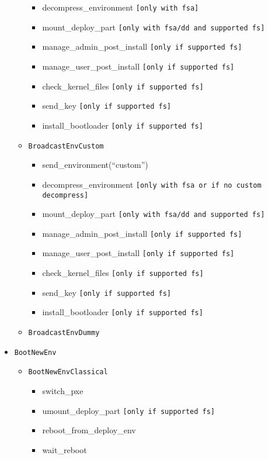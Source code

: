 \documentclass[a4wide,10pt,oneside]{book}
\begin{document}
\begin{itemize}
\begin{itemize}
\begin{itemize}
      \item decompress\_environment \texttt{[only with fsa]}
      \item mount\_deploy\_part \texttt{[only with fsa/dd and supported fs]}
      \item manage\_admin\_post\_install \texttt{[only if supported fs]}
      \item manage\_user\_post\_install \texttt{[only if supported fs]}
      \item check\_kernel\_files \texttt{[only if supported fs]}
      \item send\_key \texttt{[only if supported fs]}
      \item install\_bootloader \texttt{[only if supported fs]}
      \end{itemize}
    \item \texttt{BroadcastEnvCustom}
      \begin{itemize}
      \item send\_environment(``custom'')
      \item decompress\_environment \texttt{[only with fsa or if no custom decompress]}
      \item mount\_deploy\_part \texttt{[only with fsa/dd and supported fs]}
      \item manage\_admin\_post\_install \texttt{[only if supported fs]}
      \item manage\_user\_post\_install \texttt{[only if supported fs]}
      \item check\_kernel\_files \texttt{[only if supported fs]}
      \item send\_key \texttt{[only if supported fs]}
      \item install\_bootloader \texttt{[only if supported fs]}
      \end{itemize}
    \item \texttt{BroadcastEnvDummy}
  \end{itemize}
\item \texttt{BootNewEnv}
  \begin{itemize}
    \item \texttt{BootNewEnvClassical}
      \begin{itemize}
      \item switch\_pxe
      \item umount\_deploy\_part \texttt{[only if supported fs]}
      \item reboot\_from\_deploy\_env
      \item wait\_reboot
      \end{itemize}

\end{itemize}
\end{itemize}
\end{document}
